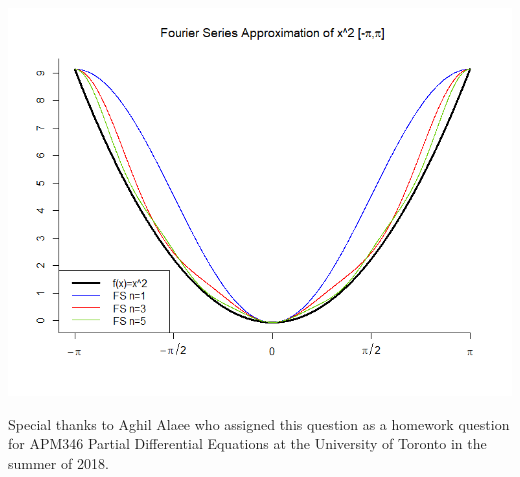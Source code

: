 \documentclass{article}
\begin{document}
\includegraphics[width=\textwidth]{Rplot.png}

Special thanks to Aghil Alaee who assigned this question as a homework question for APM346 Partial Differential Equations at the University of Toronto in the summer of 2018.
\end{document}
